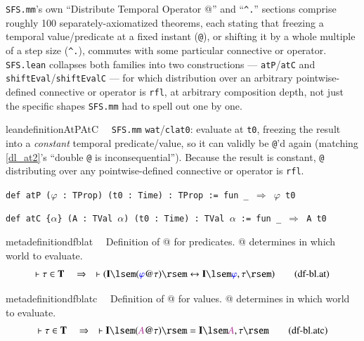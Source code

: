 
\pn \texttt{SFS.mm}'s own ``Distribute Temporal Operator @'' and ``\texttt{\^{}.}'' sections comprise roughly 100 separately-axiomatized theorems, each stating that freezing a temporal value/predicate at a fixed instant (\texttt{@}), or shifting it by a whole multiple of a step size (\texttt{\^{}.}), commutes with some particular connective or operator. \texttt{SFS.lean} collapses both families into two constructions --- \texttt{atP}/\texttt{atC} and \texttt{shiftEval}/\texttt{shiftEvalC} --- for which distribution over an arbitrary pointwise-defined connective or operator is \texttt{rfl}, at arbitrary composition depth, not just the specific shapes \texttt{SFS.mm} had to spell out one by one.

\begin{restatable}{leandefinition}{AtPAtC}~~ \texttt{SFS.mm} \texttt{wat}/\texttt{clat0}: evaluate at \texttt{t0}, freezing the result into a \emph{constant} temporal predicate/value, so it can validly be \texttt{@}'d again (matching \ref{dl_at2}'s ``double \texttt{@} is inconsequential''). Because the result is constant, \texttt{@} distributing over any pointwise-defined connective or operator is \texttt{rfl}.

\texttt{\textcolor{leancolor}{def} \textcolor{leanyellow}{atP} ($\varphi$ : TProp) (t0 : Time) : TProp := \textcolor{leancolor}{fun} \_ $\Rightarrow$ $\varphi$ t0}

\texttt{\textcolor{leancolor}{def} \textcolor{leanyellow}{atC} \{$\alpha$\} (A : TVal $\alpha$) (t0 : Time) : TVal $\alpha$ := \textcolor{leancolor}{fun} \_ $\Rightarrow$ A t0}
\label{atP}
\label{atC}
\end{restatable}

\begin{restatable}{metadefinition}{dfblat}~~ Definition of @ for predicates.
   @ determines in which world to evaluate.
\begin{align}
\vdash \tau \in \mathbf{T}\quad\Rightarrow\quad \vdash ( \mathbf{I} \lsem (
    \mw{\varphi} @ \tau ) \rsem \leftrightarrow \mathbf{I} \lsem \mw{\varphi} ,
    \tau \rsem )\label{eq:df-bl.at}\tag{df-bl.at}
\end{align}
\end{restatable}

\begin{restatable}{metadefinition}{dfblatc}~~ Definition of @ for values.
   @ determines in which world to evaluate.
\begin{align}
\vdash \tau \in \mathbf{T}\quad\Rightarrow\quad \vdash \mathbf{I} \lsem (
    \mc{A} @ \tau ) \rsem = \mathbf{I} \lsem \mc{A} , \tau
    \rsem\label{eq:df-bl.atc}\tag{df-bl.atc}
\end{align}
\end{restatable}


